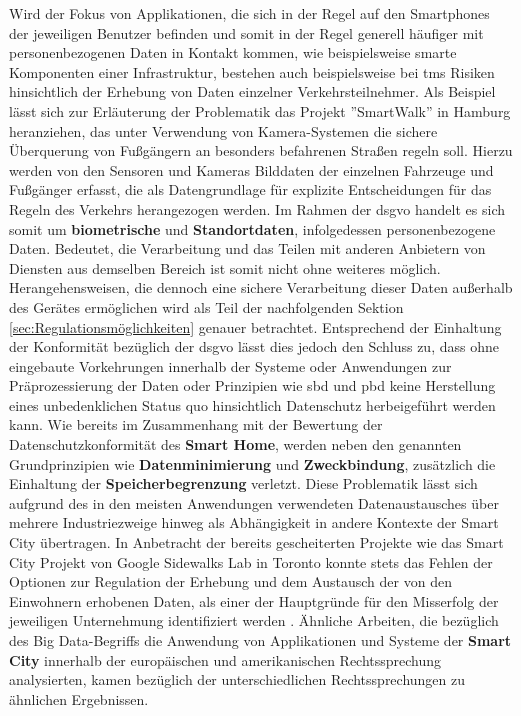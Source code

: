 Wird der Fokus von Applikationen, die sich in der Regel auf den Smartphones der jeweiligen Benutzer befinden und somit in der Regel generell häufiger mit personenbezogenen Daten in Kontakt kommen, wie beispielsweise smarte Komponenten einer Infrastruktur, bestehen auch beispielsweise bei \ac{tms} Risiken hinsichtlich der Erhebung von Daten einzelner Verkehrsteilnehmer.
Als Beispiel lässt sich zur Erläuterung der Problematik das Projekt ''SmartWalk'' \cite{SmartWalk2022} in Hamburg heranziehen, das unter Verwendung von Kamera-Systemen die sichere Überquerung von Fußgängern an besonders befahrenen Straßen regeln soll. 
Hierzu werden von den Sensoren und Kameras Bilddaten der einzelnen Fahrzeuge und Fußgänger erfasst, die als Datengrundlage für explizite Entscheidungen für das Regeln des Verkehrs herangezogen werden. Im Rahmen der \ac{dsgvo} handelt es sich somit um \textbf{biometrische} und \textbf{Standortdaten}, infolgedessen personenbezogene Daten. 
Bedeutet, die Verarbeitung und das Teilen mit anderen Anbietern von Diensten aus demselben Bereich ist somit nicht ohne weiteres möglich. Herangehensweisen, die dennoch eine sichere Verarbeitung dieser Daten außerhalb des Gerätes ermöglichen wird als Teil der nachfolgenden Sektion \ref{sec:Regulationsmöglichkeiten} genauer betrachtet. 
Entsprechend der Einhaltung der Konformität bezüglich der \ac{dsgvo} lässt dies jedoch den Schluss zu, dass ohne eingebaute Vorkehrungen innerhalb der Systeme oder Anwendungen zur Präprozessierung der Daten oder Prinzipien wie \ac{sbd} und \ac{pbd} keine Herstellung eines unbedenklichen Status quo hinsichtlich Datenschutz herbeigeführt werden kann. 
Wie bereits im Zusammenhang mit der Bewertung der Datenschutzkonformität des \textbf{Smart Home}, werden neben den genannten Grundprinzipien wie \textbf{Datenminimierung} und \textbf{Zweckbindung}, zusätzlich die Einhaltung der \textbf{Speicherbegrenzung} verletzt. 
Diese Problematik lässt sich aufgrund des in den meisten Anwendungen verwendeten Datenaustausches über mehrere Industriezweige hinweg \cite{BCG2020} als Abhängigkeit in andere Kontexte der Smart City übertragen.
In Anbetracht der bereits gescheiterten Projekte wie das Smart City Projekt von Google Sidewalks Lab in Toronto \cite{SidewalkToronto2022} konnte stets das Fehlen der Optionen zur Regulation der Erhebung und dem Austausch der von den Einwohnern erhobenen Daten, als einer der Hauptgründe für den Misserfolg der jeweiligen Unternehmung identifiziert werden \cite{Bernier2020}.
Ähnliche Arbeiten, die bezüglich des Big Data-Begriffs die Anwendung von Applikationen und Systeme der \textbf{Smart City} innerhalb der europäischen und amerikanischen Rechtssprechung analysierten, kamen bezüglich der unterschiedlichen Rechtssprechungen zu ähnlichen Ergebnissen.
